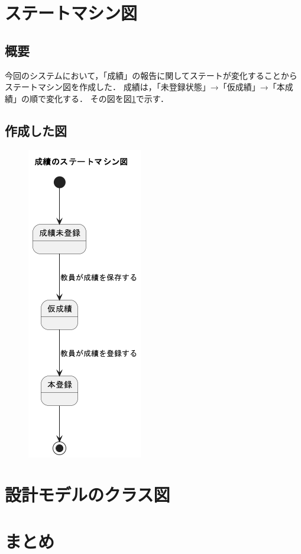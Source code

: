 \documentclass[documentclass]{jsarticle}
\begin{document}
\section{ステートマシン図}
\subsection*{概要}
今回のシステムにおいて，「成績」の報告に関してステートが変化することからステートマシン図を作成した．
成績は，「未登録状態」→「仮成績」→「本成績」の順で変化する．
その図を図\ref*{fig:8-1}で示す．

\subsection*{作成した図}
\begin{figure}[H]
  \begin{center}
    \includegraphics*[scale=0.6]{figure/8-1.png}
  \end{center}
  \caption{}
  \label{fig:8-1}
\end{figure}

\newpage

\section{設計モデルのクラス図}


\section{まとめ}
\end{document}
